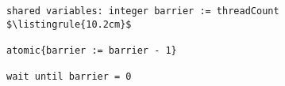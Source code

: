 \begin{center}
\begin{minipage}{\textwidth}
\begin{lstlisting}[mathescape, linewidth=10.2cm]
shared variables: integer barrier := threadCount
$\listingrule{10.2cm}$

atomic{barrier := barrier - 1}

wait until barrier = 0
\end{lstlisting}
\end{minipage}
\end{center}
